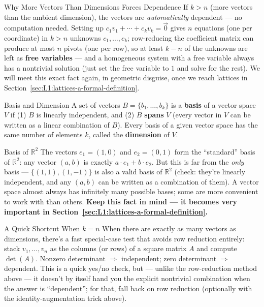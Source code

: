 \begin{rmkbox}{Why More Vectors Than Dimensions Forces Dependence}
If $k>n$ (more vectors than the ambient dimension), the vectors are \emph{automatically} dependent --- no computation needed. Setting up $c_1v_1+\cdots+c_kv_k=\vec 0$ gives $n$ equations (one per coordinate) in $k>n$ unknowns $c_1,\ldots,c_k$; row-reducing the coefficient matrix can produce at most $n$ pivots (one per row), so at least $k-n$ of the unknowns are left as \textbf{free variables} --- and a homogeneous system with a free variable always has a nontrivial solution (just set the free variable to $1$ and solve for the rest). We will meet this exact fact again, in geometric disguise, once we reach lattices in Section~\ref{sec:L1:lattices-a-formal-definition}.
\end{rmkbox}

\begin{defbox}{Basis and Dimension}
A set of vectors $B = \{b_1, \ldots, b_k\}$ is a \textbf{basis} of a vector space $V$ if (1) $B$ is linearly independent, and (2) $B$ \textbf{spans} $V$ (every vector in $V$ can be written as a linear combination of $B$). Every basis of a given vector space has the same number of elements $k$, called the \textbf{dimension} of $V$.
\end{defbox}

\begin{exbox}{Basis of $\mathbb{R}^2$}
The vectors $e_1 = (1,0)$ and $e_2 = (0,1)$ form the ``standard'' basis of $\mathbb{R}^2$: any vector $(a,b)$ is exactly $a \cdot e_1 + b \cdot e_2$. But this is far from the \emph{only} basis --- $\{(1,1), (1,-1)\}$ is also a valid basis of $\mathbb{R}^2$ (check: they're linearly independent, and any $(a,b)$ can be written as a combination of them). A vector space almost always has infinitely many possible bases; some are more convenient to work with than others. \textbf{Keep this fact in mind --- it becomes very important in Section~\ref{sec:L1:lattices-a-formal-definition}.}
\end{exbox}

\begin{rmkbox}{A Quick Shortcut When $k=n$}
When there are exactly as many vectors as dimensions, there's a fast special-case test that avoids row reduction entirely: stack $v_1,\ldots,v_n$ as the columns (or rows) of a square matrix $A$ and compute $\det(A)$. Nonzero determinant $\Rightarrow$ independent; zero determinant $\Rightarrow$ dependent. This is a quick yes/no check, but --- unlike the row-reduction method above --- it doesn't by itself hand you the explicit nontrivial combination when the answer is ``dependent''; for that, fall back on row reduction (optionally with the identity-augmentation trick above).
\end{rmkbox}

